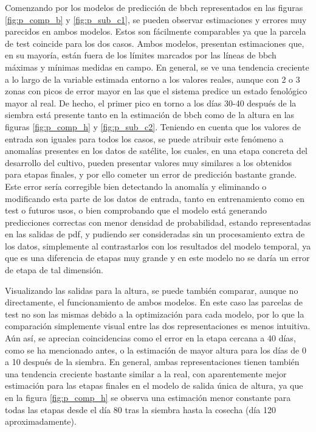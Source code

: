 \par Comenzando por los modelos de predicción de \gls{bbch} representados en las figuras \ref{fig:p_comp_b} y \ref{fig:p_sub_c1}, se pueden observar estimaciones y errores muy parecidos en ambos modelos. Estos son fácilmente comparables ya que la parcela de test coincide para los dos casos. Ambos modelos, presentan estimaciones que, en su mayoría, están fuera de los límites marcados por las líneas de \gls{bbch} máximas y mínimas medidas en campo. En general, se ve una tendencia creciente a lo largo de la variable estimada entorno a los valores reales, aunque con 2 o 3 zonas con picos de error mayor en las que el sistema predice un estado fenológico mayor al real. De hecho, el primer pico en torno a los días 30-40 después de la siembra está presente tanto en la estimación de \gls{bbch} como de la altura en las figuras \ref{fig:p_comp_h} y \ref{fig:p_sub_c2}. Teniendo en cuenta que los valores de entrada son iguales para todos los casos, se puede atribuir este fenómeno a anomalías presentes en los datos de satélite, los cuales, en  una etapa concreta del desarrollo del cultivo, pueden presentar valores muy similares a los obtenidos para etapas finales, y por ello cometer un error de predicción bastante grande. Este error sería corregible bien detectando la anomalía y eliminando o modificando esta parte de los datos de entrada, tanto en entrenamiento como en test o futuros usos, o bien comprobando que el modelo está generando predicciones correctas con menor densidad de probabilidad, estando representadas en las salidas de \gls{pdf}, y pudiendo ser consideradas sin un procesamiento extra de los datos, simplemente al contrastarlos con los resultados del modelo temporal, ya que es una diferencia de etapas muy grande y en este modelo no se daría un error de etapa de tal dimensión. 
\\
\par Visualizando las salidas para la altura, se puede también comparar, aunque no directamente, el funcionamiento de ambos modelos. En este caso las parcelas de test no son las mismas debido a la optimización para cada modelo, por lo que la comparación simplemente visual entre las dos representaciones es menos intuitiva. Aún así, se aprecian coincidencias como el error en la etapa cercana a 40 días, como se ha mencionado antes, o la estimación de mayor altura para los días de 0 a 10 después de la siembra. En general, ambas representaciones tienen también una tendencia creciente bastante similar a la real, con aparentemente mejor estimación para las etapas finales en el modelo de salida única de altura, ya que en la figura \ref{fig:p_comp_h} se observa una estimación menor constante para todas las etapas desde el día 80 tras la siembra hasta la cosecha (día 120 aproximadamente).

